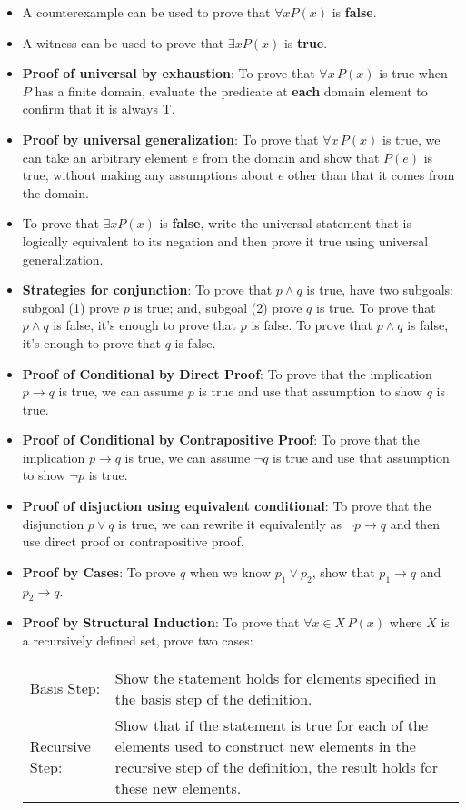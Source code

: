 \documentclass[12pt, oneside]{article}
\begin{document}
\begin{itemize}
    \item A counterexample can be used to prove that  $\forall x P(x)$ is {\bf false}.
    \item  A witness can be used to prove that  $\exists x P(x)$ is {\bf true}.
    \item {\bf Proof of universal by exhaustion}: To prove that $\forall x \, P(x)$
is true when $P$ has a finite domain, evaluate the predicate at {\bf each} domain element to confirm that it is always T.
    \item  {\bf Proof by universal generalization}: To prove that $\forall x \, P(x)$
is true, we can take an arbitrary element $e$ from the domain and show that $P(e)$ is true, without making any assumptions 
about $e$ other than that it comes from the domain.
    \item To  prove  that $\exists x P(x)$ is {\bf false}, write the universal statement that is 
    logically equivalent to its negation and then prove it true using universal generalization.
    \item {\bf Strategies for conjunction}: To prove that $p \land q$ is true, have two subgoals: 
    subgoal (1) prove $p$ 
is  true; and, subgoal (2) prove $q$ is true. To prove that $p \land q$ is false, it's enough to prove that $p$ is false.
 To prove that $p \land q$ is false, it's enough to prove that $q$ is false.
    \item {\bf Proof of Conditional by Direct Proof}: To prove that the implication $p \to q$ is true, 
    we can assume $p$ is true and use that assumption to show $q$ is true.
    \item {\bf Proof of Conditional by Contrapositive Proof}: To prove that the implication $p \to q$ is true, 
    we can assume $\neg q$ is true and use that assumption to show $\neg p$ is true.
    \item {\bf Proof of disjuction using equivalent conditional}: To prove that the 
    disjunction $p \lor q$ is true, we can rewrite it equivalently as $\lnot p \to q$ and
    then use direct proof or contrapositive proof.
    \item {\bf Proof by Cases}: To prove $q$ when we know $p_1 \lor p_2$, show that $p_1 \to q$ and $p_2 \to q$.
    \item
    {\bf Proof by Structural Induction}: To prove that $\forall x \in X \, P(x)$ where $X$ is a recursively defined set, prove two cases:
        
        \begin{tabularx}{\textwidth}{l X}
        Basis Step: & Show the statement holds for elements specified in the basis step of the definition. \\
        Recursive Step: & Show that if the statement is true for each of the elements used to construct
    new elements in the recursive step of the definition, the result holds for these new elements.
    \end{tabularx}
    

\end{itemize}
\end{document}
